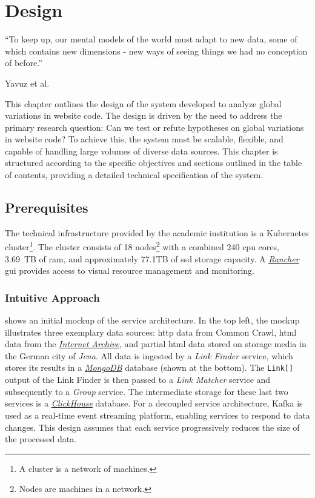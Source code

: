 \section{Design}
\label{sec:design}

\epigraph{
    ``To keep up, our mental models of the world must adapt to new data, some of which contains new dimensions - new ways of seeing things we had no conception of before.''
}{
    Yavuz et al.~\cite{Yavuz2019}
}

This chapter outlines the design of the system developed to analyze global variations in website code.
The design is driven by the need to address the primary research question: Can we test or refute hypotheses on global variations in website code?
To achieve this, the system must be scalable, flexible, and capable of handling large volumes of diverse data sources.
This chapter is structured according to the specific objectives and sections outlined in the table of contents, providing a detailed technical specification of the system.

\subsection{Prerequisites}
\label{sec:design-prerequisites}

The technical infrastructure provided by the academic institution is a Kubernetes cluster\footnote{A cluster is a network of machines.}.
The cluster consists of 18 nodes\footnote{Nodes are machines in a network.} with a combined 240 \ac{cpu} cores, 3.69~TB of \ac{ram}, and approximately 77.1TB of \ac{ssd} storage capacity.
A \href{https://www.rancher.com/}{\textit{Rancher}} \ac{gui} provides access to visual resource management and monitoring.

\subsubsection{Intuitive Approach}
\label{sec:design-prerequisites-intuitive-approach}

 shows an initial mockup of the service architecture.
In the top left, the mockup illustrates three exemplary data sources: \ac{http} data from Common Crawl, \ac{html} data from the \href{https://archive.org/}{\textit{Internet Archive}}, and partial \ac{html} data stored on storage media in the German city of \textit{Jena}.
All data is ingested by a \textit{Link Finder} service, which stores its results in a \href{https://www.mongodb.com/}{\textit{MongoDB}} database (shown at the bottom).
The \texttt{Link[]} output of the Link Finder is then passed to a \textit{Link Matcher} service and subsequently to a \textit{Group} service.
The intermediate storage for these last two services is a \href{https://clickhouse.com/}{\textit{ClickHouse}} database.
For a decoupled service architecture, Kafka is used as a real-time event streaming platform, enabling services to respond to data changes.
This design assumes that each service progressively reduces the size of the processed data.


